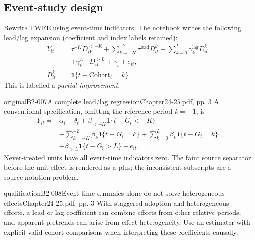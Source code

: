 \subsection{Event-study design}
Rewrite TWFE using event-time indicators. The notebook writes the following lead/lag expansion (coefficient and index labels retained):
\begin{align*}
Y_{it}={}&\tau^{-K}D_{ik}^{<-K}
 +\sum_{k=-K}^{-2}\tau^{\mathrm{lead}}D_{it}^{k}
 +\sum_{k=0}^{L}\gamma_k^{\mathrm{lag}}D_{it}^{k}\\
 &+\gamma_k^{L+}D_{it}^{>L}+\gamma_i+e_{it},\\
D_{it}^{k}={}&\mathbf1\{t-\mathrm{Cohort}_i=k\}.
\end{align*}
This is labelled a \emph{partial improvement}.\begin{reviewnote}{original}{B2-007}{A complete lead/lag regression}{Chapter24-25.pdf, pp. 3}
A conventional specification, omitting the reference period \(k=-1\), is
\begin{align*}
Y_{it}={}&\alpha_i+\theta_t+\beta_{<-K}\mathbf1\{t-G_i<-K\}\\
&+\sum_{k=-K}^{-2}\beta_k\mathbf1\{t-G_i=k\}
+\sum_{k=0}^{L}\beta_k\mathbf1\{t-G_i=k\}\\
&+\beta_{>L}\mathbf1\{t-G_i>L\}+e_{it}.
\end{align*}
Never-treated units have all event-time indicators zero. The faint source separator before the unit effect is rendered as a plus; the inconsistent subscripts are a source-notation problem.
\par{}
\end{reviewnote}
\begin{reviewnote}{qualification}{B2-008}{Event-time dummies alone do not solve heterogeneous effects}{Chapter24-25.pdf, pp. 3}
With staggered adoption and heterogeneous effects, a lead or lag coefficient can combine effects from other relative periods, and apparent pretrends can arise from effect heterogeneity. Use an estimator with explicit valid cohort comparisons when interpreting these coefficients causally.
\par{}
\end{reviewnote}


